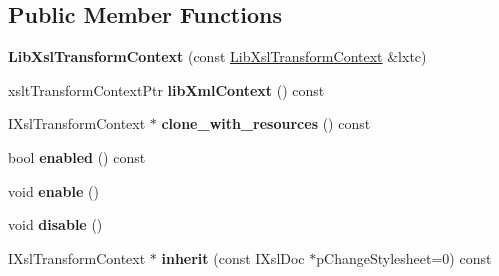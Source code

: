 \subsection*{\-Public \-Member \-Functions}
\begin{DoxyCompactItemize}
\item 
\hypertarget{classgeneral__server_1_1LibXslTransformContext_a3934c149f6103670eb816b1645d62334}{{\bfseries \-Lib\-Xsl\-Transform\-Context} (const \hyperlink{classgeneral__server_1_1LibXslTransformContext}{\-Lib\-Xsl\-Transform\-Context} \&lxtc)}\label{classgeneral__server_1_1LibXslTransformContext_a3934c149f6103670eb816b1645d62334}

\item 
\hypertarget{classgeneral__server_1_1LibXslTransformContext_a2c4b0cac272c64eaf5dfc6cac24fcd44}{xslt\-Transform\-Context\-Ptr {\bfseries lib\-Xml\-Context} () const }\label{classgeneral__server_1_1LibXslTransformContext_a2c4b0cac272c64eaf5dfc6cac24fcd44}

\item 
\hypertarget{classgeneral__server_1_1LibXslTransformContext_ab0126572d28bb5ae558deedadeefb2e7}{\-I\-Xsl\-Transform\-Context $\ast$ {\bfseries clone\-\_\-with\-\_\-resources} () const }\label{classgeneral__server_1_1LibXslTransformContext_ab0126572d28bb5ae558deedadeefb2e7}

\item 
\hypertarget{classgeneral__server_1_1LibXslTransformContext_aa2811e6d74eb90997f26539e07526e5b}{bool {\bfseries enabled} () const }\label{classgeneral__server_1_1LibXslTransformContext_aa2811e6d74eb90997f26539e07526e5b}

\item 
\hypertarget{classgeneral__server_1_1LibXslTransformContext_ab8ea8d5d06198fb0227770f7c04e323a}{void {\bfseries enable} ()}\label{classgeneral__server_1_1LibXslTransformContext_ab8ea8d5d06198fb0227770f7c04e323a}

\item 
\hypertarget{classgeneral__server_1_1LibXslTransformContext_a3639795532caf185925c082c1b693d77}{void {\bfseries disable} ()}\label{classgeneral__server_1_1LibXslTransformContext_a3639795532caf185925c082c1b693d77}

\item 
\hypertarget{classgeneral__server_1_1LibXslTransformContext_a192e3f9a38b8fabfd953ea2c83ac1ef3}{\-I\-Xsl\-Transform\-Context $\ast$ {\bfseries inherit} (const \-I\-Xsl\-Doc $\ast$p\-Change\-Stylesheet=0) const }\label{classgeneral__server_1_1LibXslTransformContext_a192e3f9a38b8fabfd953ea2c83ac1ef3}


\end{DoxyCompactItemize}
